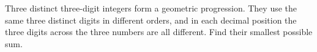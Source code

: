 Three distinct three-digit integers form a geometric progression. They use the same three distinct digits in different orders, and in each decimal position the three digits across the three numbers are all different. Find their smallest possible sum.
